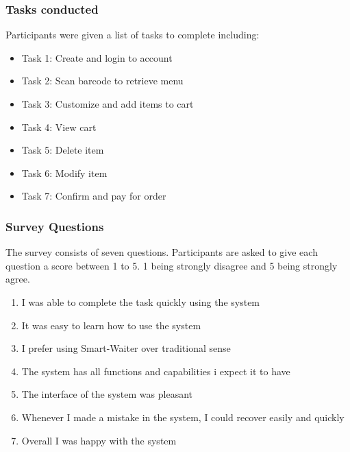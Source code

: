 \documentclass[12pt]{article}
\begin{document}
\subsubsection{Tasks conducted}
Participants were given a list of tasks to complete including: 
\begin{itemize}  
\item Task 1: Create and login to account
\item Task 2: Scan barcode to retrieve menu
\item Task 3: Customize and add items to cart
\item Task 4: View cart
\item Task 5: Delete item
\item Task 6: Modify item
\item Task 7: Confirm and pay for order
\end{itemize}

\subsubsection{Survey Questions}
The survey consists of seven questions. Participants are asked to give each question a score between 1 to 5. 1 being strongly disagree and 5 being strongly agree.
\begin{enumerate}
  \item I was able to complete the task quickly using the system
  \item It was easy to learn how to use the system
  \item I prefer using Smart-Waiter over traditional sense
  \item The system has all functions and capabilities i expect it to have
  \item The interface of the system was pleasant
 \item Whenever I made a mistake in the system, I could recover easily and quickly
 \item Overall I was happy with the system
\end{enumerate}
\end{document}
